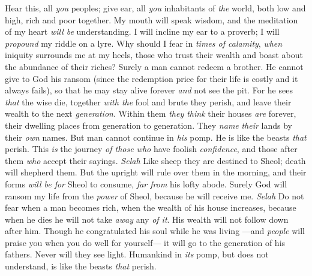 \begin{biblechapter} %
 Hear this, all \textit{you} peoples; 
give ear, all \textit{you} inhabitants of \textit{the} world,
\verse both low and high, 
rich and poor together.
\verse My mouth will speak wisdom, 
and the meditation of my heart \textit{will be} understanding.
\verse I will incline my ear to a proverb; 
I will \textit{propound} my riddle on a lyre.
\verse Why should I fear in \textit{times of calamity}, 
\textit{when} iniquity surrounds me at my heels,
\verse those who trust their wealth 
and boast about the abundance of their riches?
\verse Surely a man cannot redeem a brother. 
He cannot give to God his ransom
\verse (since the redemption price for their life is costly 
and it always fails),
\verse so that he may stay alive forever 
\textit{and} not see the pit.
\verse For he sees \textit{that} the wise die, 
together \textit{with the} fool and brute they perish, 
and leave their wealth to the next \textit{generation}.
\verse Within them \textit{they think} their houses \textit{are} forever, 
their dwelling places from generation to generation. 
They \textit{name} \textit{their} lands by their \textit{own} names.
\verse But man cannot continue in \textit{his} pomp. 
He is like the beasts \textit{that} perish.
\verse This \textit{is} the journey \textit{of those who} have foolish \textit{confidence}, 
and those after them \textit{who} accept their sayings. \textit{Selah}
\verse Like sheep they are destined to Sheol; 
death will shepherd them. 
But the upright will rule over them in the morning, 
and their forms \textit{will be for} Sheol to consume, 
\textit{far from} his lofty abode.
\verse Surely God will ransom my life 
from the \textit{power} of Sheol, 
because he will receive me. \textit{Selah}
\verse Do not fear when a man becomes rich, 
when the wealth of his house increases,
\verse because when he dies he will not take \textit{away} any \textit{of it}. 
His wealth will not follow down after him.
\verse Though he congratulated his soul while he was living 
—and \textit{people} will praise you when you do well for yourself—
\verse it will go to the generation of his fathers. 
Never will they see light.
\verse Humankind in \textit{its} pomp, but does not understand, 
is like the beasts \textit{that} perish.
\end{biblechapter}

